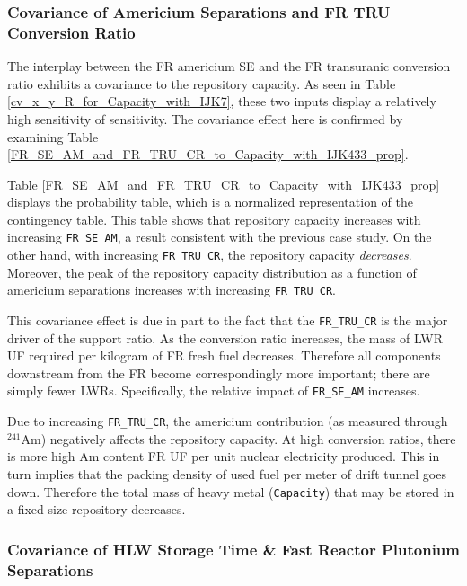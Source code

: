 \documentclass[preprint,12pt]{elsarticle}
\newcommand{\superscript}[1]{\ensuremath{^{\textrm{#1}}}}
\newcommand{\nuc}[2]{\superscript{#2}{#1}}
\begin{document}
\subsubsection{Covariance of Americium Separations and FR TRU Conversion Ratio}
\label{sec:am_se_fr_tru_cr}

The interplay between the FR americium SE and the FR transuranic conversion ratio exhibits a covariance
to the repository capacity.  As seen in Table \ref{cv_x_y_R_for_Capacity_with_IJK7}, these two inputs display a relatively high sensitivity of sensitivity.  The covariance effect here is confirmed by examining Table \ref{FR_SE_AM_and_FR_TRU_CR_to_Capacity_with_IJK433_prop}.

%


Table \ref{FR_SE_AM_and_FR_TRU_CR_to_Capacity_with_IJK433_prop} displays the probability table, which is a normalized representation of the contingency table.
This table shows that repository capacity increases with increasing \texttt{FR\_SE\_AM}, a result consistent
with the previous case study.  On the other hand, with increasing \texttt{FR\_TRU\_CR}, the repository capacity \emph{decreases}.  Moreover, the
peak of the repository capacity distribution as a function
of americium separations increases with increasing \texttt{FR\_TRU\_CR}.

This covariance effect is due in part to the fact that the \texttt{FR\_TRU\_CR} is the major driver of the support ratio.  As the conversion ratio
increases, the mass of LWR UF required per kilogram of FR fresh fuel decreases.  Therefore all components downstream from the FR become correspondingly more important;
there are simply fewer LWRs.  Specifically, the relative impact of \texttt{FR\_SE\_AM} increases.

Due to increasing \texttt{FR\_TRU\_CR}, the americium contribution (as measured through \nuc{Am}{241}) negatively affects the repository capacity.  At high conversion ratios, there is more high Am content FR UF per unit nuclear electricity produced.  This in turn implies that the
packing density of used fuel per meter of drift tunnel goes down.  Therefore the total mass of heavy metal (\texttt{Capacity}) that may be stored in a
fixed-size repository decreases.


\subsubsection{Covariance of HLW Storage Time \& Fast Reactor Plutonium Separations}
\label{sec:hlw_pu_covariance}
\end{document}
